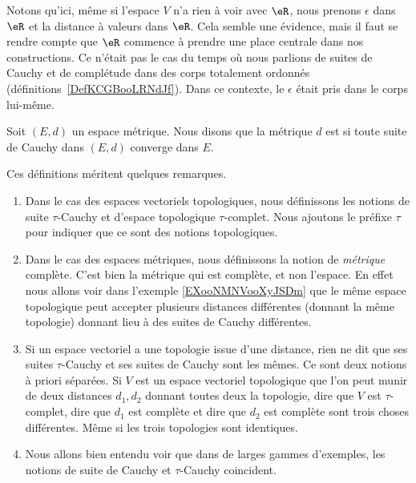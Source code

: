 Notons qu'ici, même si l'espace \( V\) n'a rien à voir avec \( \eR\), nous prenons \( \epsilon\) dans \( \eR\) et la distance à valeurs dans \( \eR\). Cela semble une évidence, mais il faut se rendre compte que \( \eR\) commence à prendre une place centrale dans nos constructions. Ce n'était pas le cas du temps où nous parlions de suites de Cauchy et de complétude dans des corps totalement ordonnés (définitions~\ref{DefKCGBooLRNdJf}). Dans ce contexte, le \( \epsilon\) était pris dans le corps lui-même.

\begin{definition}       \label{DEFooHBAVooKmqerL}
	Soit \( (E,d)\) un espace métrique. Nous disons que la métrique \( d\) est  si toute suite de Cauchy dans \( (E,d)\) converge dans \( E\).
\end{definition}

\begin{normaltext}
	Ces définitions méritent quelques remarques.
	\begin{enumerate}
		\item
		      Dans le cas des espaces vectoriels topologiques, nous définissons les notions de suite \( \tau\)-Cauchy et d'espace topologique \( \tau\)-complet. Nous ajoutons le préfixe \( \tau\) pour indiquer que ce sont des notions topologiques.
		\item
		      Dans le cas des espaces métriques, nous définissons la notion de \emph{métrique} complète. C'est bien la métrique qui est complète, et non l'espace. En effet nous allons voir dans l'exemple \ref{EXooNMNVooXyJSDm} que le même espace topologique peut accepter plusieurs distances différentes (donnant la même topologie) donnant lieu à des suites de Cauchy différentes.
		\item
		      Si un espace vectoriel a une topologie issue d'une distance, rien ne dit que ses suites \( \tau\)-Cauchy et ses suites de Cauchy sont les mêmes. Ce sont deux notions à priori séparées. Si \( V\) est un espace vectoriel topologique que l'on peut munir de deux distances \( d_1, d_2\) donnant toutes deux la topologie, dire que \( V\) est \( \tau\)-complet, dire que \( d_1\) est complète et dire que \( d_2\) est complète sont trois choses différentes. Même si les trois topologies sont identiques.
		\item
		      Nous allons bien entendu voir que dans de larges gammes d'exemples, les notions de suite de Cauchy et \( \tau\)-Cauchy coincident.
	\end{enumerate}
\end{normaltext}

